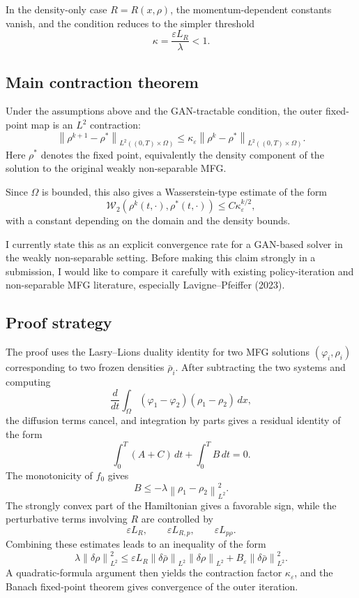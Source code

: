 \documentclass[11pt]{article}
\newcommand{\W}{\mathcal{W}}
\newcommand{\norm}[1]{\left\lVert #1 \right\rVert}
\newcommand{\eps}{\varepsilon}
\begin{document}
In the density-only case $R=R(x,\rho)$, the momentum-dependent constants vanish, and the condition reduces to the simpler threshold
\[
  \kappa=\frac{\eps L_R}{\lambda}<1.
\]

\subsection{Main contraction theorem}

Under the assumptions above and the GAN-tractable condition, the outer fixed-point map is an $L^2$ contraction:
\[
  \norm{\rho^{k+1}-\rho^*}_{L^2((0,T)\times\Omega)}
  \leq
  \kappa_\eps
  \norm{\rho^k-\rho^*}_{L^2((0,T)\times\Omega)}.
\]
Here $\rho^*$ denotes the fixed point, equivalently the density component of the solution to the original weakly non-separable MFG.

Since $\Omega$ is bounded, this also gives a Wasserstein-type estimate of the form
\[
  \W_2(\rho^k(t,\cdot),\rho^*(t,\cdot))
  \leq C\kappa_\eps^{k/2},
\]
with a constant depending on the domain and the density bounds.

I currently state this as an explicit convergence rate for a GAN-based solver in the weakly non-separable setting. Before making this claim strongly in a submission, I would like to compare it carefully with existing policy-iteration and non-separable MFG literature, especially Lavigne--Pfeiffer (2023).

\subsection{Proof strategy}

The proof uses the Lasry--Lions duality identity for two MFG solutions $(\varphi_i,\rho_i)$ corresponding to two frozen densities $\bar\rho_i$. After subtracting the two systems and computing
\[
  \frac{d}{dt}\int_\Omega (\varphi_1-\varphi_2)(\rho_1-\rho_2)\,dx,
\]
the diffusion terms cancel, and integration by parts gives a residual identity of the form
\[
  \int_0^T(A+C)\,dt+
  \int_0^T B\,dt=0.
\]
The monotonicity of $f_0$ gives
\[
  B\leq -\lambda\norm{\rho_1-\rho_2}_{L^2}^2.
\]
The strongly convex part of the Hamiltonian gives a favorable sign, while the perturbative terms involving $R$ are controlled by
\[
  \eps L_R,\qquad \eps L_{R,p},\qquad \eps L_{p\rho}.
\]
Combining these estimates leads to an inequality of the form
\[
  \lambda\norm{\delta\rho}_{L^2}^2
  \leq
  \eps L_R
  \norm{\delta\bar\rho}_{L^2}
  \norm{\delta\rho}_{L^2}
  +
  B_\eps
  \norm{\delta\bar\rho}_{L^2}^2.
\]
A quadratic-formula argument then yields the contraction factor $\kappa_\eps$, and the Banach fixed-point theorem gives convergence of the outer iteration.
\end{document}
